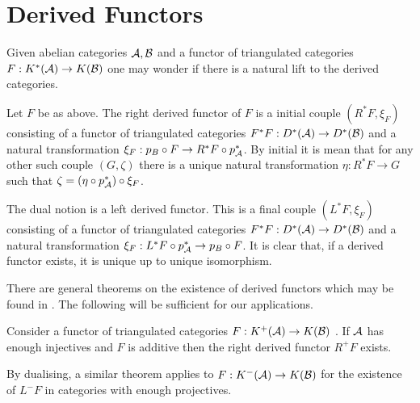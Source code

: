 \section{Derived Functors}
Given abelian categories $\AA, \mathcal{B}$ and a functor of triangulated categories $F:K^*(\AA)\to K(\mathcal{B})$ one may wonder if there is a natural lift to the derived categories.
\begin{definition}
 Let $F$ be as above. The right derived functor of $F$ is a initial couple $(R^*F,\xi_F)$ consisting of a functor of triangulated categories $F^*F:D^*(\AA) \to D^*(\mathcal{B})$ and a natural transformation $\xi_F:p_B\circ F \to R^*F \circ p_\AA^*$.
 By initial it is mean that for any other such couple $(G,\zeta)$ there is a unique natural transformation $\eta: R^*F\to G$ such that $\zeta = (\eta \circ p_\AA^*)\circ \xi_{F}$.
\end{definition}
The dual notion is a left derived functor. This is a final couple $(L^*F,\xi_F)$ consisting of a functor of triangulated categories $F^*F:D^*(\AA) \to D^*(\mathcal{B})$ and a natural transformation $\xi_F:  L^*F \circ p_\AA^* \to p_B\circ F$.
It is clear that, if a derived functor exists, it is unique up to unique isomorphism.

There are general theorems on the existence of derived functors which may be found in \cite[Chapter 1]{dimca2004sheaves}.
The following will be sufficient for our applications.
\begin{theorem}\label{thm: InjectivesAllowDerivedFunctor}
 Consider a functor of triangulated categories $F:K^+(\AA)\to K(\mathcal{B})$ .
 If $\AA$ has enough injectives and $F$ is additive then the right derived functor $R^+F$ exists.
\end{theorem}
By dualising, a similar theorem applies to $F:K^-(\AA)\to K(\mathcal{B})$ for the existence of $L^- F$ in categories with enough projectives.

